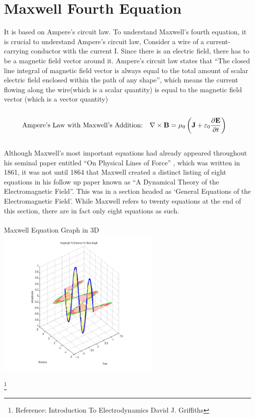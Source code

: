 \documentclass{article}
\begin{document}
\section{Maxwell Fourth Equation}
It is based on Ampere’s circuit law. To understand Maxwell’s fourth equation, it is crucial to understand Ampere’s circuit law,
Consider a wire of a current-carrying conductor with the current I. Since there is an electric field, there has to be a magnetic field vector around it. Ampere’s circuit law states that “The closed line integral of magnetic field vector is always equal to the total amount of scalar electric field enclosed within the path of any shape”, which means the current flowing along the wire(which is a scalar quantity) is equal to the magnetic field vector (which is a vector quantity)\\\\
\begin{align*}
\parindent 0px
   \text{Ampere's Law with Maxwell's Addition:} \quad & \nabla \times \mathbf{B} = \mu_0 \left(\mathbf{J} + \varepsilon_0 \frac{\partial \mathbf{E}}{\partial t}\right)
\end{align*}\\

Although Maxwell’s most important equations had already appeared throughout his seminal paper entitled “On Physical Lines of Force” , which was written in 1861, it was not until 1864 that Maxwell created a distinct listing of eight equations in his follow up paper known as “A Dynamical Theory of the Electromagnetic Field”. This was in a section headed as ‘General Equations of the Electromagnetic Field’. While Maxwell refers to twenty equations at the end of this section, there are in fact only eight equations as such.\cite{ref=article}\\\\
Maxwell Equation Graph in 3D\\
\includegraphics[width=8cm]{Graph-in-3D.png}

\footnote{Reference: Introduction To Electrodynamics David J. Griffiths }

\newpage


\end{document}
